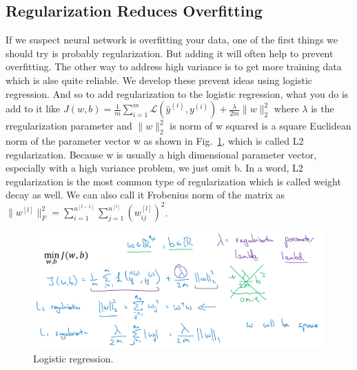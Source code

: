 \documentclass[a4paper]{article}
\begin{document}
\subsection{Regularization Reduces Overfitting}
If we suspect  neural network is overfitting your data, one of the first things we should try is probably regularization. But adding it will often help to prevent overfitting. The other way to address high variance is to get more training data which is alse quite reliable. We develop these prevent ideas using logistic regression. And so to add regularization to the logistic regression, what you do is add to it like $J(w,b)=\frac{1}{m}\sum_{i=1}^{m}\mathcal{L}(\hat{y}^{(i)},y^{(i)})+\frac{\lambda}{2m}\parallel w\parallel^2_2$ where $\lambda$ is the rregularization parameter and $\parallel w\parallel^2_2$ is norm of w squared is a square Euclidean norm of the parameter vector w as shown in Fig.~\ref{p9}, which is called L2 regularization. Because w is usually a high dimensional parameter vector, especially with a high variance problem, we just omit b. In a word, L2 regularization is the most common type of regularization which is called weight decay as well. We can also call it Frobenius norm of the matrix as $\parallel w^{[l]}\parallel^2_F=\sum_{i=1}^{n^{[l-1]}}\sum_{j=1}^{n^{[l]}}(w_{ij}^{[l]})^2$.
\begin{figure}
	\begin{center}
		\includegraphics[scale=0.3]{figures/10.png}
	\end{center}
	\caption{Logistic regression.}
	\label{p9}
\end{figure}
\end{document}
